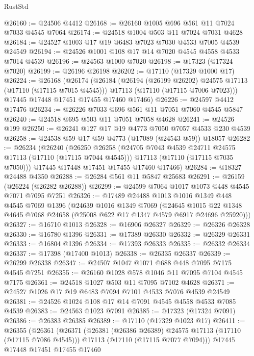 \begin{lexlean}{RustStd}
\begin{coremodule}
@26160 := @24506 @4412
@26168 := @26160 @1005 @696 @561 @11 @7024 @7033 @4545 @7064
@26174 := @24518 @1004 @503 @11 @7024 @7031 @4628
@26184 := @24527 @1003 @17 @19 @6483 @7023 @7030 @4533 @7005 @4539 @24549
@26194 := @24526 @1001 @108 @17 @14 @7020 @4545 @4558 @4533 @7014 @4539
@26196 := @24563 @1000 @7020
@26198 := @17323 (@17324 @7020)
@26199 := @26196 @26198
@26202 := @17110 (@17329 @1000 @17)
@26224 := @26168
    (@26174
      (@26184
        (@26194 (@26199 @26202) @24575 @17113 (@17110 (@17115 @7015 @4545)))
        @17113
        (@17110 (@17115 @7006 @7023)))
      @17445
      @17448
      @17451
      @17455
      @17460
      @17466)
@26226 := @24597 @4412 @17476
@26234 := @26226 @7033 @696 @561 @11 @7051 @7060 @4545 @5847
@26240 := @24518 @695 @503 @11 @7051 @7058 @4628
@26241 := @24526 @199
@26250 := @26241 @127 @17 @19 @4773 @7050 @7057 @4533 @230 @4539
@26258 := @24538 @59 @17 @59 @4773 (@17089 (@24543 @59)) @18057
@26282 := @26234
    (@26240
      (@26250
        @26258
        (@24705 @7043 @4539 @24711 @24575 @17113 (@17110 (@17115 @7044 @4545)))
        @17113
        (@17110 (@17115 @7035 @7050)))
      @17445
      @17448
      @17451
      @17455
      @17460
      @17466)
@26284 := @18327 @24488 @4350
@26288 := @26284 @561 @11 @5847 @25683
@26291 := @26159 (@26224 (@26282 @26288))
@26299 := @24599 @7064 @1017 @1073 @448 @4545 @7071 @7095 @7251
@26326 := @17489
    @24488
    @1013
    @1016
    @1349
    @448
    @4545
    @7069
    @1396
    (@24639
      @1016
      @1349
      @7069
      (@24645 @1015 @22 @1348 @4645 @7068 @24658 (@25008 @622 @17 @1347 @4579 @6917 @24696 @25920)))
@26327 := @16710 @1013
@26328 := @16906 @26327
@26329 := @26326 @26328
@26330 := @16780 @1396
@26331 := @17389 @26330
@26332 := @26329 @26331
@26333 := @16804 @1396
@26334 := @17393 @26333
@26335 := @26332 @26334
@26337 := @17398 (@17400 @1013)
@26338 := @26335 @26337
@26339 := @26299 @26338
@26347 := @24507 @1047 @1071 @688 @448 @7095 @7175 @4545 @7251
@26355 := @26160 @1028 @578 @1046 @11 @7095 @7104 @4545 @7175
@26361 := @24518 @1027 @503 @11 @7095 @7102 @4628
@26371 := @24527 @1026 @17 @19 @6483 @7094 @7101 @4533 @7076 @4539 @24549
@26381 := @24526 @1024 @108 @17 @14 @7091 @4545 @4558 @4533 @7085 @4539
@26383 := @24563 @1023 @7091
@26385 := @17323 (@17324 @7091)
@26386 := @26383 @26385
@26389 := @17110 (@17329 @1023 @17)
@26411 := @26355
    (@26361
      (@26371
        (@26381 (@26386 @26389) @24575 @17113 (@17110 (@17115 @7086 @4545)))
        @17113
        (@17110 (@17115 @7077 @7094)))
      @17445
      @17448
      @17451
      @17455
      @17460

\end{coremodule}
\end{lexlean}
